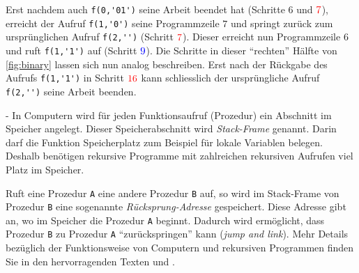 \noindent
Erst nachdem auch \verb|f(0,'01')| seine Arbeit beendet hat (Schritte $6$ und $\textcolor{Red}{7}$), erreicht der Aufruf \verb|f(1,'0')| seine Programmzeile $7$ und springt zurück zum ursprünglichen Aufruf \verb|f(2,'')| (Schritt $\textcolor{Red}{7}$). Dieser erreicht nun Programmzeile $6$ und ruft \verb|f(1,'1')| auf (Schritt $\textcolor{Blue}{9}$). Die Schritte in dieser \enquote{rechten} Hälfte von \cref{fig:binary} lassen sich nun analog beschreiben. Erst nach der Rückgabe des Aufrufs \verb|f(1,'1')| in Schritt $\textcolor{Red}{16}$ kann schliesslich der ursprüngliche Aufruf \verb|f(2,'')| seine Arbeit beenden.

\clearpage
\begin{myBox}{-}
In Computern wird für jeden Funktionsaufruf (Prozedur) ein Abschnitt im Speicher angelegt. Dieser Speicherabschnitt wird \textit{Stack-Frame} genannt. Darin darf die Funktion Speicherplatz zum Beispiel für lokale Variablen belegen. Deshalb benötigen rekursive Programme mit zahlreichen rekursiven Aufrufen viel Platz im Speicher.

Ruft eine Prozedur \verb|A| eine andere Prozedur \verb|B| auf, so wird im Stack-Frame von Prozedur \verb|B| eine sogenannte \textit{Rücksprung-Adresse} gespeichert. Diese Adresse gibt an, wo im Speicher die Prozedur \verb|A| beginnt. Dadurch wird ermöglicht, dass Prozedur \verb|B| zu Prozedur \verb|A| \enquote{zurückspringen} kann (\textit{jump and link}). Mehr Details bezüglich der Funktionsweise von Computern und rekursiven Programmen finden Sie in den hervorragenden Texten \cite{Malvino} und \cite{Sauter}.
\end{myBox}

\clearpage
\shipoutAnswer